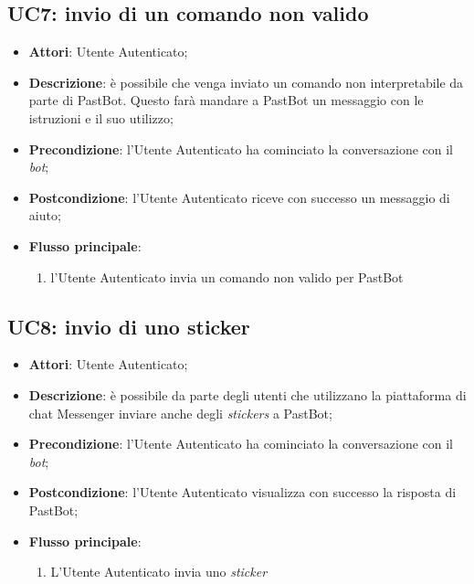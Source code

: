 
\subsection{UC7: invio di un comando non valido}
\label{uc:uc7}
\hypertarget{UC7}{}

\begin{itemize}
  \item \textbf{Attori}: Utente Autenticato;
  \item \textbf{Descrizione}: è possibile che venga inviato un comando non
interpretabile da parte di PastBot. Questo farà mandare a PastBot un messaggio
con le istruzioni e il suo utilizzo;
  \item \textbf{Precondizione}: l'Utente Autenticato ha cominciato la
conversazione con il \textit{bot};
  \item \textbf{Postcondizione}: l'Utente Autenticato riceve con successo un
messaggio di aiuto;
  \item \textbf{Flusso principale}:
  \begin{enumerate}
    \item l'Utente Autenticato invia un comando non valido per PastBot
  \end{enumerate}
\end{itemize}



\subsection{UC8: invio di uno sticker}
\label{uc:uc8}
\hypertarget{UC8}{}

\begin{itemize}
  \item \textbf{Attori}: Utente Autenticato;
  \item \textbf{Descrizione}: è possibile da parte degli utenti che utilizzano
la piattaforma di chat Messenger inviare anche degli \textit{stickers} a
PastBot;
  \item \textbf{Precondizione}: l'Utente Autenticato ha cominciato la
conversazione con il \textit{bot};
  \item \textbf{Postcondizione}: l'Utente Autenticato visualizza con successo
la risposta di PastBot;
  \item \textbf{Flusso principale}:
  \begin{enumerate}
    \item L'Utente Autenticato invia uno \textit{sticker}
  \end{enumerate}
\end{itemize}


